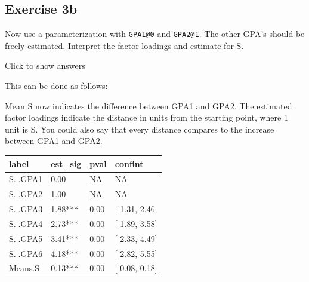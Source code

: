 \documentclass[
]{book}
\newenvironment{Shaded}{\begin{snugshade}}{\end{snugshade}}
\newcommand{\AttributeTok}[1]{\textcolor[rgb]{0.77,0.63,0.00}{#1}}
\newcommand{\CommentTok}[1]{\textcolor[rgb]{0.56,0.35,0.01}{\textit{#1}}}
\newcommand{\ConstantTok}[1]{\textcolor[rgb]{0.00,0.00,0.00}{#1}}
\newcommand{\FunctionTok}[1]{\textcolor[rgb]{0.00,0.00,0.00}{#1}}
\newcommand{\NormalTok}[1]{#1}
\newcommand{\OtherTok}[1]{\textcolor[rgb]{0.56,0.35,0.01}{#1}}
\newcommand{\SpecialCharTok}[1]{\textcolor[rgb]{0.00,0.00,0.00}{#1}}
\newcommand{\StringTok}[1]{\textcolor[rgb]{0.31,0.60,0.02}{#1}}
\begin{document}
\hypertarget{exercise-3b}{%
\subsection{Exercise 3b}\label{exercise-3b}}

Now use a parameterization with \href{mailto:GPA1@0}{\nolinkurl{GPA1@0}} and \href{mailto:GPA2@1}{\nolinkurl{GPA2@1}}. The other GPA's should be freely estimated.
Interpret the factor loadings and estimate for S.

Click to show answers

This can be done as follows:

\begin{Shaded}
\end{Shaded}

Mean S now indicates the difference between GPA1 and GPA2. The estimated factor loadings
indicate the distance in units from the starting point, where 1 unit is S. You could also say
that every distance compares to the increase between GPA1 and GPA2.

\begin{tabular}[t]{l|l|l|l}
\hline
label & est\_sig & pval & confint\\
\hline
S.|.GPA1 & 0.00 & NA & NA\\
\hline
S.|.GPA2 & 1.00 & NA & NA\\
\hline
S.|.GPA3 & 1.88*** & 0.00 & [ 1.31,  2.46]\\
\hline
S.|.GPA4 & 2.73*** & 0.00 & [ 1.89,  3.58]\\
\hline
S.|.GPA5 & 3.41*** & 0.00 & [ 2.33,  4.49]\\
\hline
S.|.GPA6 & 4.18*** & 0.00 & [ 2.82,  5.55]\\
\hline
Means.S & 0.13*** & 0.00 & [ 0.08,  0.18]\\
\hline
\end{tabular}
\end{document}
